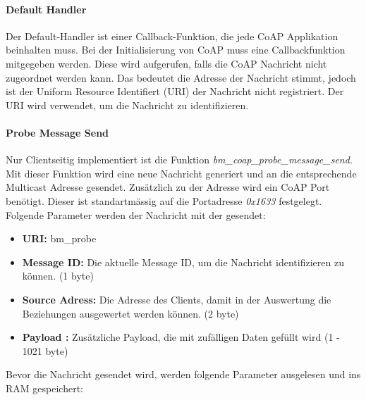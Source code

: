 \paragraph{Default Handler} 
Der Default-Handler ist einer Callback-Funktion, die jede CoAP Applikation beinhalten muss. Bei der Initialisierung von CoAP muss eine Callbackfunktion mitgegeben werden. Diese wird aufgerufen, falls die CoAP Nachricht nicht zugeordnet werden kann. Das bedeutet die Adresse der Nachricht stimmt, jedoch ist der Uniform Resource Identifiert (URI) der Nachricht nicht registriert. Der URI wird verwendet, um die Nachricht zu identifizieren. 

\paragraph{Probe Message Send}
Nur Clientseitig implementiert ist die Funktion \textit{bm\_coap\_probe\_message\_send}. Mit dieser Funktion wird eine neue Nachricht generiert und an die entsprechende Multicast Adresse gesendet. Zusätzlich zu der Adresse wird ein CoAP Port benötigt. Dieser ist standartmässig auf die Portadresse \textit{0x1633} festgelegt. Folgende Parameter werden der Nachricht mit der gesendet:

\begin{itemize}
	\item \textbf{URI:} bm\_probe
	\item \textbf{Message ID:} Die aktuelle Message ID, um die Nachricht identifizieren zu können. (1 byte)
	\item \textbf{Source Adress:} Die Adresse des Clients, damit in der Auswertung die Beziehungen ausgewertet werden können. (2 byte)
	\item \textbf{Payload :} Zusätzliche Payload, die mit zufälligen Daten gefüllt wird (1 - 1021 byte)
\end{itemize}

Bevor die Nachricht gesendet wird, werden folgende Parameter ausgelesen und ins RAM gespeichert:

